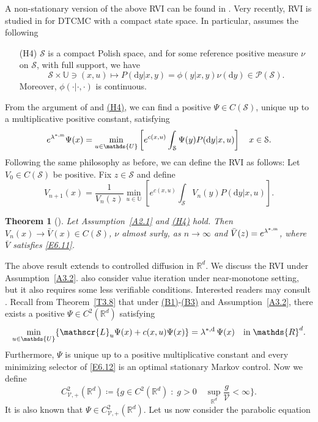 \documentclass[notitlepage,11pt,reqno]{amsart}
\numberwithin{equation}{section}
\theoremstyle{plain}
\newtheorem{theorem}{Theorem}[section]
\theoremstyle{definition}
\theoremstyle{remark}
\newcommand{\Act}{{\mathds{U}}}
\newcommand{\sL}{{\mathscr{L}}}
\newcommand{\Pm}{{\mathcal{P}}}     %
\newcommand{\cS}{{\mathcal{S}}}     %
\newcommand{\Lyap}{{\mathscr{V}}}   %
\newcommand{\lamstrdm}{\lambda^{*,{\rm m}}}
\newcommand{\lamstrdf}{\lambda^{*,{\rm d}}}
\newcommand{\Rd}{{\mathds{R}^{d}}}
\newcommand{\D}{\mathrm{d}} %
\newcommand{\df}{\coloneqq}
\begin{document}
A non-stationary version of the above RVI can be found in \cite{MR2203811}. Very recently, RVI is studied in \cite{MR4276001} for DTCMC with a compact state space.
In particular, \cite{MR4276001} assumes the following
\begin{itemize}
\item[\hypertarget{H4}{(H4)}] $\cS$ is a compact Polish space, and for some reference positive measure $\nu$ on $\cS$, with full support, we have
$$\cS\times\Act\ni(x, u)\mapsto P(\D{y}|x, y)=\phi(y|x, y)\nu(\D{y})\in\Pm(\cS).$$
Moreover, $\phi(\cdot|\cdot, \cdot)$ is continuous.
\end{itemize}
From the argument of \cite[Theorem~2.2]{MR3629428} and  \hyperlink{H4}{(H4)}, we can find a positive $\Psi\in C(\cS)$, unique up to a multiplicative positive constant, satisfying
\begin{equation}\label{E6.11}
e^{\lamstrdm}\Psi(x)=\min_{u\in\Act}\left[e^{c(x, u)} \int_\cS \Psi(y) P(\D{y}|x, u)\right]\quad x\in\cS.
\end{equation}
Following the same philosophy as before, we can define the RVI as follows: Let $V_0\in C(\cS)$ be positive. Fix $z\in\cS$ and define
$$V_{n+1}(x)=\frac{1}{V_n(z)}\min_{u\in\Act} \left[e^{c(x, u)} \int_\cS V_{n}(y) P(\D{y}|x, u)\right].$$
\begin{theorem}[\cite{MR4276001}]
Let Assumption~\ref{A2.1} and \hyperlink{H4}{(H4)} hold. Then $V_{n}(x)\to \bar{V}(x) \in C(\cS)$, $\nu$ almost surly, as $n\to\infty$ and $\bar{V}(z)=e^{\lamstrdm}$, where 
$\bar{V}$ satisfies \eqref{E6.11}.
\end{theorem}
The above result extends to controlled diffusion in $\Rd$. We discuss the RVI under Assumption~\ref{A3.2}. \cite{MR4276001} also consider 
value iteration under near-monotone setting, but it also requires some less verifiable conditions. Interested readers may consult \cite[Theorem~3.2]{MR4276001}.
Recall from Theorem~\ref{T3.8} that under \hyperlink{B1}{(B1)}-\hyperlink{B3}{(B3)} and Assumption~\ref{A3.2}, there exists a positive $\Psi\in C^2(\Rd)$ satisfying 
\begin{equation}\label{E6.12}
 \min_{u\in\Act}\{\sL_u\Psi(x) +  c(x, u)\Psi(x)\}=\lamstrdf\,\Psi(x)\quad \text{in}\; \Rd.
\end{equation}
Furthermore, $\Psi$ is unique up to a positive multiplicative constant and every minimizing selector of \eqref{E6.12} is an optimal stationary Markov control. Now we define
$$C^2_{\Lyap, +}(\Rd)\df \{g\in C^2(\Rd)\; :\; g>0\quad \sup_{\Rd}\frac{g}{\Lyap}<\infty\}.$$
It is also known that $\Psi\in C^2_{\Lyap, +}(\Rd)$. Let us now consider the parabolic equation
\end{document}
